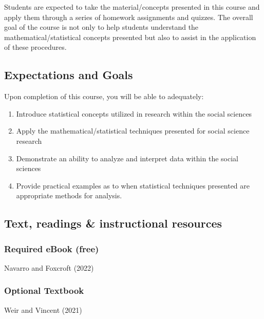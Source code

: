 \documentclass[
  letterpaper,
  DIV=11,
  numbers=noendperiod]{scrartcl}
\providecommand{\tightlist}{%
  \setlength{\itemsep}{0pt}\setlength{\parskip}{0pt}}\usepackage{longtable,booktabs,array}
\begin{document}
Students are expected to take the material/concepts presented in this
course and apply them through a series of homework assignments and
quizzes. The overall goal of the course is not only to help students
understand the mathematical/statistical concepts presented but also to
assist in the application of these procedures.

\hypertarget{expectations-and-goals}{%
\subsection{Expectations and Goals}\label{expectations-and-goals}}

Upon completion of this course, you will be able to adequately:

\begin{enumerate}
\def\labelenumi{\arabic{enumi}.}
\tightlist
\item
  Introduce statistical concepts utilized in research within the social
  sciences
\item
  Apply the mathematical/statistical techniques presented for social
  science research
\item
  Demonstrate an ability to analyze and interpret data within the social
  sciences
\item
  Provide practical examples as to when statistical techniques presented
  are appropriate methods for analysis.
\end{enumerate}

\hypertarget{text-readings-instructional-resources}{%
\subsection{Text, readings \& instructional
resources}\label{text-readings-instructional-resources}}

\hypertarget{required-ebook-free}{%
\subsubsection{Required eBook (free)}\label{required-ebook-free}}

Navarro and Foxcroft (2022)

\hypertarget{optional-textbook}{%
\subsubsection{Optional Textbook}\label{optional-textbook}}

Weir and Vincent (2021)
\end{document}
